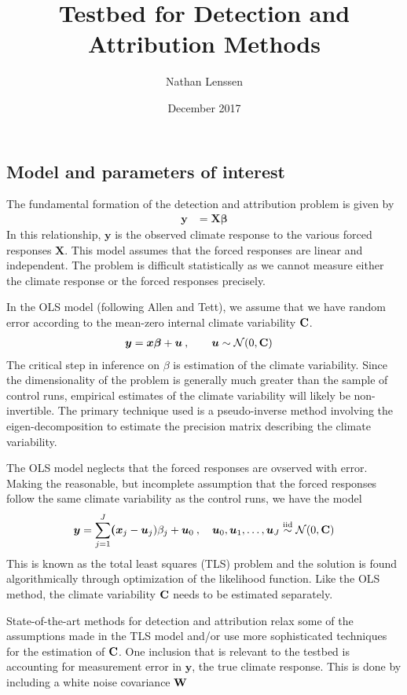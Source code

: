 \documentclass[11pt]{article}
\title{Testbed for Detection and Attribution Methods}
\author{Nathan Lenssen}
\date{December 2017}
\newcommand{\C}{\ensuremath{\text{Cov}}}
\def\*#1{\bm{#1}}
\def\C{\textbf{\text{C}}}
\def\W{\textbf{\text{W}}}
\begin{document}
\maketitle

\subsection{Model and parameters of interest}
The fundamental formation of the detection and attribution problem is given by 
\begin{align}
\*y &= \*X \*\beta
\end{align}
In this relationship, $\*y$ is the observed climate response to the various forced responses $ \*X$. This model assumes that the forced responses are linear and independent. The problem is difficult statistically as we cannot measure either the climate response or the forced responses precisely. 

In the OLS model (following Allen and Tett), we assume that we have random error according to the mean-zero internal climate variability $\C$. 
\begin{align}
\*y &= \*x \*\beta + \*u\: , \qquad \* u \sim \mathcal{N}(0, \C)
\end{align}
The critical step in inference on $\beta$ is estimation of the climate variability. Since the dimensionality of the problem is generally much greater than the sample of control runs, empirical estimates of the climate variability will likely be non-invertible. The primary technique used is a pseudo-inverse method involving the eigen-decomposition to estimate the precision matrix describing the climate variability.

The OLS model neglects that the forced responses are ovserved with error. Making the reasonable, but incomplete assumption that the forced responses follow the same climate variability as the control runs, we have the model
\[
\*y = \sum_{j=1}^J \*(\*x_j - \*u_j) \beta_j + \*u_0\: , \quad \*u_0,\*u_1,\dots,\*u_J \stackrel{\text{iid}}{\sim} \mathcal{N}(0,\C)
\]
This is known as the total least squares (TLS) problem and the solution is found algorithmically through optimization of the likelihood function. Like the OLS method, the climate variability $\C$ needs to be estimated separately.

State-of-the-art methods for detection and attribution relax some of the assumptions made in the TLS model and/or use more sophisticated techniques for the estimation of $\C$. One inclusion that is relevant to the testbed is accounting for measurement error in $\*y$, the true climate response. This is done by including a white noise covariance $\W$
\end{document}
